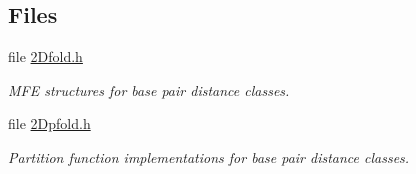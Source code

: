 \subsection*{Files}
\begin{DoxyCompactItemize}
\item 
file \mbox{\hyperlink{2Dfold_8h}{2\+Dfold.\+h}}
\begin{DoxyCompactList}\small\item\em M\+FE structures for base pair distance classes. \end{DoxyCompactList}\item 
file \mbox{\hyperlink{2Dpfold_8h}{2\+Dpfold.\+h}}
\begin{DoxyCompactList}\small\item\em Partition function implementations for base pair distance classes. \end{DoxyCompactList}\end{DoxyCompactItemize}
